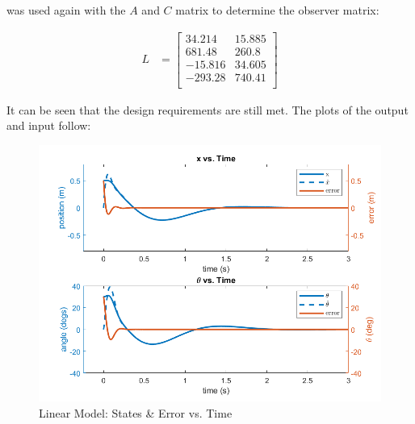 \documentclass[12pt, letterpaper, onecolumn]{article}
\begin{document}
 was used again with the $A$ and $C$ matrix to determine the observer matrix:

\begin{equation*}
    \begin{split}
        L & =
        \begin{bmatrix}
            34.214  & 15.885 \\
            681.48  & 260.8  \\
            -15.816 & 34.605 \\
            -293.28 & 740.41 \\
        \end{bmatrix}
    \end{split}
\end{equation*}

It can be seen that the design requirements are still met. The plots of the output and input follow:

\begin{figure}[!h]
    \centering
    \includegraphics[width=\linewidth]{figs/p5-a-states.png}
    \caption{Linear Model: States \& Error vs. Time}
    \label{}
\end{figure}
\end{document}
